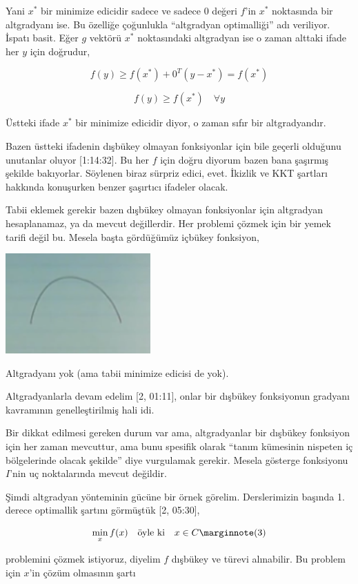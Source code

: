 \documentclass[12pt,fleqn]{article}\usepackage{../../common}
\begin{document}
Yani $x^*$ bir minimize edicidir sadece ve sadece 0 değeri $f$'in $x^*$
noktasında bir altgradyanı ise. Bu özelliğe çoğunlukla ``altgradyan
optimalliği'' adı veriliyor. İspatı basit. Eğer $g$ vektörü $x^*$
noktasındaki altgradyan ise o zaman alttaki ifade her $y$ için doğrudur,

$$
f(y) \ge f(x^*) + 0^T (y-x^*) = f(x^*)
$$

$$
f(y) \ge f(x^*) \quad \forall y
$$

Üstteki ifade $x^*$ bir minimize edicidir diyor, o zaman sıfır bir
altgradyandır. 

Bazen üstteki ifadenin dışbükey olmayan fonksiyonlar için bile geçerli
olduğunu unutanlar oluyor [1:14:32]. Bu her $f$ için doğru diyorum bazen
bana şaşırmış şekilde bakıyorlar. Söylenen biraz sürpriz edici,
evet. İkizlik ve KKT şartları hakkında konuşurken benzer şaşırtıcı ifadeler
olacak.

Tabii eklemek gerekir bazen dışbükey olmayan fonksiyonlar için altgradyan
hesaplanamaz, ya da mevcut değillerdir. Her problemi çözmek için bir yemek
tarifi değil bu. Mesela başta gördüğümüz içbükey fonksiyon,

\includegraphics[width=15em]{func_42_subgrad_01.png}

Altgradyanı yok (ama tabii minimize edicisi de yok). 

Altgradyanlarla devam edelim [2, 01:11], onlar bir dışbükey fonksiyonun
gradyanı kavramının genelleştirilmiş hali idi. 

Bir dikkat edilmesi gereken durum var ama, altgradyanlar bir dışbükey
fonksiyon için her zaman mevcuttur, ama bunu spesifik olarak ``tanım
kümesinin nispeten iç bölgelerinde olacak şekilde'' diye vurgulamak
gerekir. Mesela gösterge fonksiyonu $I$'nin uç noktalarında mevcut değildir.

Şimdi altgradyan yönteminin gücüne bir örnek görelim. Derslerimizin başında
1. derece optimallik şartını görmüştük [2, 05:30],

$$
\min_x f(x) \quad \textrm{öyle ki} \quad x \in C
\mlabel{3}
$$

problemini çözmek istiyoruz, diyelim $f$ dışbükey ve türevi alınabilir. Bu
problem için $x$'in çözüm olmasının şartı 
\end{document}
